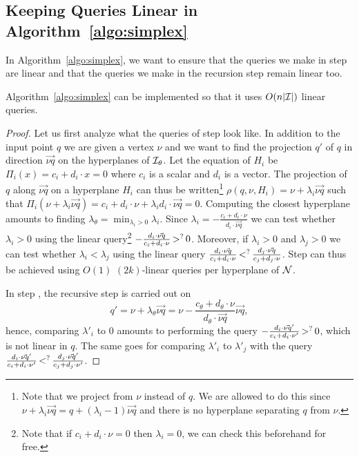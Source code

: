 \subsection{Keeping Queries Linear in Algorithm~\ref*{algo:simplex}}%
\label{app:keeplinear}

In Algorithm~\ref{algo:simplex}, we want to ensure that the queries we make in step
 are linear and that the queries we make in the recursion step
remain linear too.
\begin{lemma}
	Algorithm~\ref{algo:simplex} can be implemented so that it uses
	$O(n|{\mathcal{I}}|)$ linear queries.
\end{lemma}%
\begin{proof}
Let us first analyze what the queries of step  look like. In addition
to the input point \(q\) we are given a vertex \(\nu\) and we want to find the
projection \(q'\) of \(q\) in direction \(\vec{\nu q}\) on the hyperplanes of
\(\mathcal{I}_{\theta}\). Let the equation of \(H_{i}\) be \(\Pi_{i}(x) =
c_{i} + d_{i}
\cdot x = 0\) where \(c_{i}\) is a scalar and \(d_{i}\) is a
vector.
The projection of \(q\) along \(\vec{\nu q}\) on a hyperplane \(H_i\) can thus
be written\footnote{Note that we project from \(\nu\) instead of \(q\). We are
allowed to do this since \(\nu + \lambda_{i} \vec{\nu q} = q + (\lambda_i - 1)
\vec{\nu q}\) and there is no hyperplane
separating \(q\) from \(\nu\).}
\(\rho(q,\nu,H_i) = \nu + \lambda_{i} \vec{\nu q}\) such that \(\Pi_{i}(\nu +
		\lambda_{i} \vec{\nu q}) = c_{i} + d_{i} \cdot \nu +
		\lambda_{i} d_{i} \cdot
\vec{\nu q} = 0\). Computing the closest hyperplane amounts to finding
\(\lambda_{\theta} = \min_{\lambda_i > 0} \lambda_i\). Since \(\lambda_i = -
\frac{c_i + d_i \cdot \nu}{d_i \cdot \vec{\nu q}}\) we can test whether
\(\lambda_i > 0\)
using the linear query\footnote{Note that if $c_i + d_i \cdot \nu = 0$ then
$\lambda_i=0$, we can check this beforehand for free.}
\(-\frac{d_i \cdot \vec{\nu q}}{c_i + d_i
\cdot \nu} \mathop{>}^{?} 0\). Moreover, if \(\lambda_i > 0\) and \(\lambda_j > 0\)
we can test whether $\lambda_i < \lambda_j$ using the linear query \(
\frac{d_i \cdot \vec{\nu q}}{c_i + d_i \cdot \nu}
\mathop{<}^{?}
\frac{d_j \cdot \vec{\nu q}}{c_j + d_j \cdot \nu}\).
Step  can thus be achieved using \(O(1)\) \((2k)\)-linear queries per
hyperplane of \(\mathcal{N}\).

In step , the
recursive step is carried out on
\[
	q' = \nu + \lambda_{\theta} \vec{\nu q} = \nu -
\frac{c_{\theta} + d_{\theta} \cdot \nu}{d_{\theta} \cdot \vec{\nu q}}
\vec{\nu q},
\]
hence, comparing \(\lambda'_i\) to \(0\) amounts to performing the
query \(-\frac{d_i \cdot \vec{\nu q}'}{c_i + d_i \cdot \nu'}
\mathop{>}^{?} 0\), which is not linear in \(q\). The same goes for comparing
\(\lambda'_i\) to \(\lambda'_j\) with the query
\(\frac{d_i \cdot \vec{\nu q}'}{c_i + d_i \cdot \nu'}
\mathop{<}^{?}
\frac{d_j \cdot \vec{\nu q}'}{c_j + d_j \cdot \nu'}\).


\end{proof}
